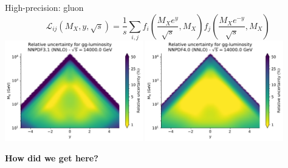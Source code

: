 \documentclass[aspectratio=169,9pt]{beamer}
\begin{document}
\begin{frame}[t]{High-precision: gluon}
	\begin{equation*}
	\mathcal{L}_{i j}\left(M_{X}, y, \sqrt{s}\right)
	=\frac{1}{s} \sum_{i, j} f_{i}\left(\frac{M_{X} e^{y}}{\sqrt{s}}, M_{X}\right) f_{j}\left(\frac{M_{X} e^{-y}}{\sqrt{s}}, M_{X}\right)
	\end{equation*}
	\includegraphics[width=0.45\textwidth]{plot_lumi2d_uncertainty_NNPDF31_gg}
	\includegraphics[width=0.45\textwidth]{plot_lumi2d_uncertainty_NNPDF40_gg}
    \begin{center}
	    \textbf{How did we get here?}
	\end{center}
\end{frame}
\end{document}
